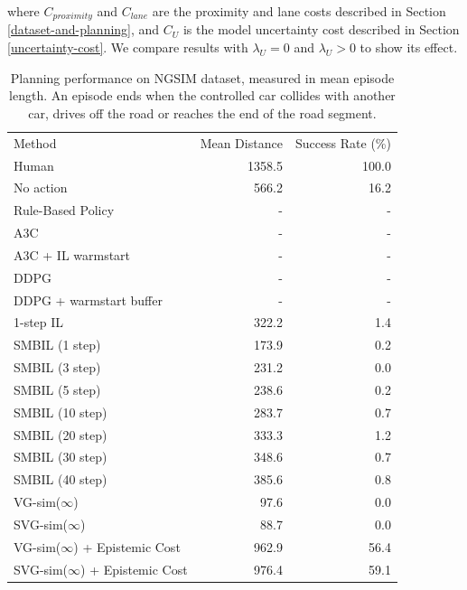 \documentclass{article} %
\begin{document}
    where $C_{proximity}$ and $C_{lane}$ are the proximity and lane costs described in Section \ref{dataset-and-planning}, and $C_U$ is the model uncertainty cost described in Section \ref{uncertainty-cost}. We compare results with $\lambda_U = 0$ and $\lambda_U > 0$ to show its effect.



  \begin{table}[t]
    \centering
  \begin{tabular}{|lrr|}
    \hline
    Method & Mean Distance & Success Rate (\%)  \\
    \hhline{|===|}
    Human & 1358.5 & 100.0 \\
    \hline
    No action & 566.2 & 16.2 \\
    Rule-Based Policy & - & - \\
    \hline
    A3C & - & - \\
    A3C + IL warmstart & - & - \\
    DDPG & - & - \\
    DDPG + warmstart buffer & - & - \\
    \hline
    1-step IL & 322.2 & 1.4 \\
    SMBIL (1 step) & 173.9 & 0.2 \\
    SMBIL (3 step) & 231.2 & 0.0 \\
    SMBIL (5 step) & 238.6 & 0.2 \\
    SMBIL (10 step) & 283.7 & 0.7 \\
    SMBIL (20 step) & 333.3 & 1.2 \\
    SMBIL (30 step) & 348.6 & 0.7 \\
    SMBIL (40 step) & 385.6 & 0.8 \\
    \hline
    VG-sim($\infty$) & 97.6 & 0.0 \\
    SVG-sim($\infty$) & 88.7 & 0.0 \\
    VG-sim($\infty$) + Epistemic Cost & 962.9 & 56.4 \\
    SVG-sim($\infty$) + Epistemic Cost & 976.4 & 59.1 \\
    \hline
  \end{tabular}
  \caption{Planning performance on NGSIM dataset, measured in mean episode length. An episode ends when the controlled car collides with another car, drives off the road or reaches the end of the road segment.}
  \label{main-table}
  \end{table}
\end{document}
